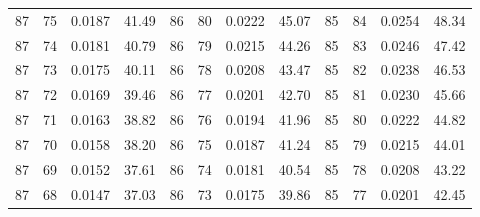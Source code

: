 \begin{tabular}{llll|llll|llll}
87 & 75 & 0.0187 & 41.49 & 86 & 80 & 0.0222 & 45.07 & 85 & 84 & 0.0254 & 48.34\\
87 & 74 & 0.0181 & 40.79 & 86 & 79 & 0.0215 & 44.26 & 85 & 83 & 0.0246 & 47.42\\
87 & 73 & 0.0175 & 40.11 & 86 & 78 & 0.0208 & 43.47 & 85 & 82 & 0.0238 & 46.53\\
87 & 72 & 0.0169 & 39.46 & 86 & 77 & 0.0201 & 42.70 & 85 & 81 & 0.0230 & 45.66\\
87 & 71 & 0.0163 & 38.82 & 86 & 76 & 0.0194 & 41.96 & 85 & 80 & 0.0222 & 44.82\\
87 & 70 & 0.0158 & 38.20 & 86 & 75 & 0.0187 & 41.24 & 85 & 79 & 0.0215 & 44.01\\
87 & 69 & 0.0152 & 37.61 & 86 & 74 & 0.0181 & 40.54 & 85 & 78 & 0.0208 & 43.22\\
87 & 68 & 0.0147 & 37.03 & 86 & 73 & 0.0175 & 39.86 & 85 & 77 & 0.0201 & 42.45\\
\bottomrule
\end{tabular}
\newpage
